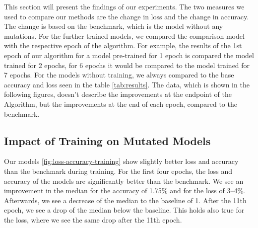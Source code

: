 This section will present the findings of our experiments.
The two measures we used to compare our methods are the change in loss and the change in accuracy.
The change is based on the benchmark, which is the model without any mutations.
For the further trained models, we compared the comparison model with the respective epoch of the algorithm.
For example, the results of the 1st epoch of our algorithm for a model pre-trained for 1 epoch is compared the model trained for 2 epochs, for 6 epochs it would be compared to the model trained for 7 epochs.
For the models without training, we always compared to the base accuracy and loss seen in the table \ref{tab:results}.
The data, which is shown in the following figures, doesn't describe the improvements at the endpoint of the Algorithm, but the improvements at the end of each epoch, compared to the benchmark.

\subsection{Impact of Training on Mutated Models}\label{subsec:impact-of-training-on-mutated-models}
Our models \ref{fig:loss-accuracy-training} show slightly better loss and accuracy than the benchmark during training.
For the first four epochs, the loss and accuracy of the models are significantly better than the benchmark.
We see an improvement in the median for the accuracy of 1.75\% and for the loss of 3--4\%.
Afterwards, we see a decrease of the median to the baseline of 1.
After the 11th epoch, we see a drop of the median below the baseline.
This holds also true for the loss, where we see the same drop after the 11th epoch.

